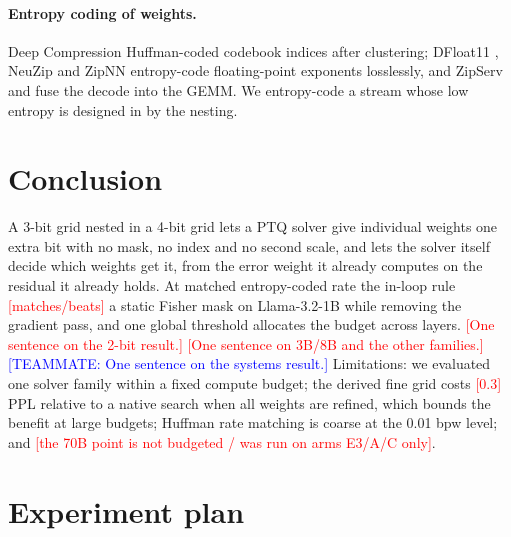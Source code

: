 \documentclass{article}
\newcommand{\tbd}[1]{\textcolor{red}{[#1]}}
\newcommand{\teammate}[1]{\textcolor{blue}{[TEAMMATE: #1]}}
\begin{document}
\paragraph{Entropy coding of weights.} Deep Compression
\citep{han2016deepcompression} Huffman-coded codebook indices after
clustering; DFloat11 \citep{zhang2025dfloat11}, NeuZip
\citep{hao2024neuzip} and ZipNN \citep{hershcovitch2024zipnn} entropy-code
floating-point exponents losslessly, and ZipServ \citep{zipserv2026} and
\citet{shannonbound2026} fuse the decode into the GEMM. We entropy-code a
stream whose low entropy is designed in by the nesting.

\section{Conclusion}
\label{sec:conclusion}

A 3-bit grid nested in a 4-bit grid lets a PTQ solver give individual
weights one extra bit with no mask, no index and no second scale, and
lets the solver itself decide which weights get it, from the error weight
it already computes on the residual it already holds. At matched
entropy-coded rate the in-loop rule \tbd{matches/beats} a static Fisher
mask on Llama-3.2-1B while removing the gradient pass, and one global
threshold allocates the budget across layers. \tbd{One sentence on the
2-bit result.} \tbd{One sentence on 3B/8B and the other families.}
\teammate{One sentence on the systems result.} Limitations: we evaluated
one solver family within a fixed compute budget; the derived fine grid
costs \tbd{0.3} PPL relative to a native search when all weights are
refined, which bounds the benefit at large budgets; Huffman rate matching
is coarse at the 0.01 bpw level; and \tbd{the 70B point is not budgeted
/ was run on arms E3/A/C only}.




\newpage
\appendix
\onecolumn

\section{Experiment plan}
\label{app:plan}
\end{document}
